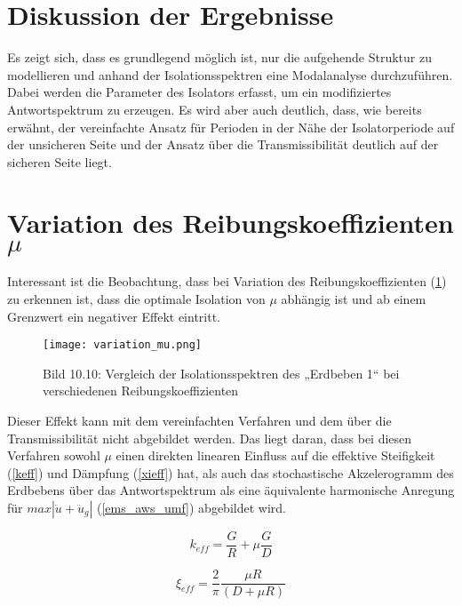 \section{Diskussion der Ergebnisse}
\label{sec:diskussion}

Es zeigt sich, dass es grundlegend möglich ist, nur die aufgehende Struktur zu modellieren und anhand der Isolationsspektren eine Modalanalyse durchzuführen.
Dabei werden die Parameter des Isolators erfasst, um ein modifiziertes Antwortspektrum zu erzeugen.
Es wird aber auch deutlich, dass, wie bereits erwähnt, der vereinfachte Ansatz für Perioden in der Nähe der Isolatorperiode auf der unsicheren Seite und der Ansatz über die Transmissibilität deutlich auf der sicheren Seite liegt.

\section{Variation des Reibungskoeffizienten $\mu$}
\label{sec:muvariation}

Interessant ist die Beobachtung, dass bei Variation des Reibungskoeffizienten (\cref{fig:muvariation}) zu erkennen ist, dass die optimale Isolation von $\mu$ abhängig ist und ab einem Grenzwert ein negativer Effekt eintritt.

\begin{figure}[H]
    \centering
    \texttt{[image: variation\_mu.png]}
    \caption{Bild 10.10: Vergleich der Isolationsspektren des „Erdbeben 1“ bei verschiedenen Reibungskoeffizienten \cite{Isemann}}
    \label{fig:muvariation}
\end{figure}

Dieser Effekt kann mit dem vereinfachten Verfahren und dem über die Transmissibilität nicht abgebildet werden. Das liegt daran, dass bei diesen Verfahren sowohl $\mu$ einen direkten linearen Einfluss auf die effektive Steifigkeit (\cref{keff}) und Dämpfung (\cref{xieff}) hat, als auch das stochastische Akzelerogramm des Erdbebens über das Antwortspektrum als eine äquivalente harmonische Anregung für $max|\ddot u + \ddot u_g|$ (\cref{ems_aws_umf}) abgebildet wird.

\begin{equation*}
k_{eff} = \frac{G}{R} + \mu \frac{G}{D}
\end{equation*}

\begin{equation*}
\xi_{eff} = \frac{2}{\pi} \frac{\mu R}{(D + \mu R)}
\end{equation*}

